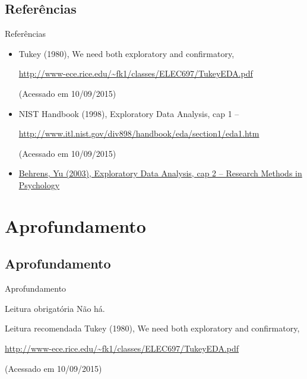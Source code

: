 \documentclass{beamer}
\begin{document}
\subsection{Referências}

\begin{frame}{Referências}
  \begin{itemize}
    \tiny
  \item Tukey (1980), We need both exploratory and confirmatory,

    {\tiny \url{http://www-ece.rice.edu/~fk1/classes/ELEC697/TukeyEDA.pdf}}

    (Acessado em 10/09/2015)
  \item NIST Handbook (1998), Exploratory Data Analysis, cap 1 --

    {\tiny \url{http://www.itl.nist.gov/div898/handbook/eda/section1/eda1.htm}}

    (Acessado em 10/09/2015)
  \item \href{https://doi.org/10.1002/0471264385.wei0202}
  {Behrens, Yu (2003), Exploratory Data Analysis, cap 2 -- Research Methods in Psychology}
  \end{itemize}
\end{frame}

\section{Aprofundamento}

\subsection{Aprofundamento}

\begin{frame}{Aprofundamento}
  \begin{block}{Leitura obrigatória}
    Não há.
  \end{block}
  \begin{block}{Leitura recomendada}
    \tiny
    Tukey (1980), We need both exploratory and confirmatory,

    {\tiny \url{http://www-ece.rice.edu/~fk1/classes/ELEC697/TukeyEDA.pdf}}

    (Acessado em 10/09/2015)
  \end{block}
\end{frame}
\end{document}

